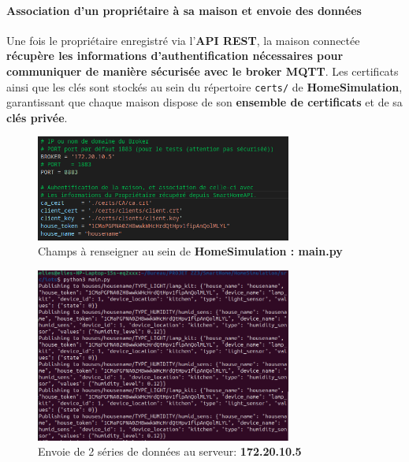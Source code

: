 \documentclass[10pt, a4paper]{report}
\begin{document}
	
	\paragraph{Association d'un propriétaire à sa maison et envoie des données\\}
		Une fois le propriétaire enregistré via l’\textbf{API REST}, la maison connectée \textbf{récupère les informations d’authentification nécessaires pour communiquer de manière sécurisée avec le broker MQTT}. Les certificats ainsi que les clés sont stockés au sein du répertoire \texttt{certs/} de \textbf{HomeSimulation}, garantissant que chaque maison dispose de son \textbf{ensemble de certificats} et de sa \textbf{clés privée}.
	 
		
		\begin{figure}[h!]
			\centering
			\includegraphics[width=0.75\textwidth]{ressources/img/preuves/champsRenseignes}
			\caption{Champs à renseigner au sein de \textbf{HomeSimulation : main.py}}
			\label{fig:champsARenseigner}
		\end{figure}
		
		\newpage
		
		\begin{figure}[h!]
			\centering
			\includegraphics[width=0.75\textwidth]{ressources/img/preuves/envoieDonnesAPI}
			\caption{Envoie de 2 séries de données au serveur: \textbf{172.20.10.5}}
			\label{fig:envoieDonnees}
		\end{figure}
		
\end{document}
